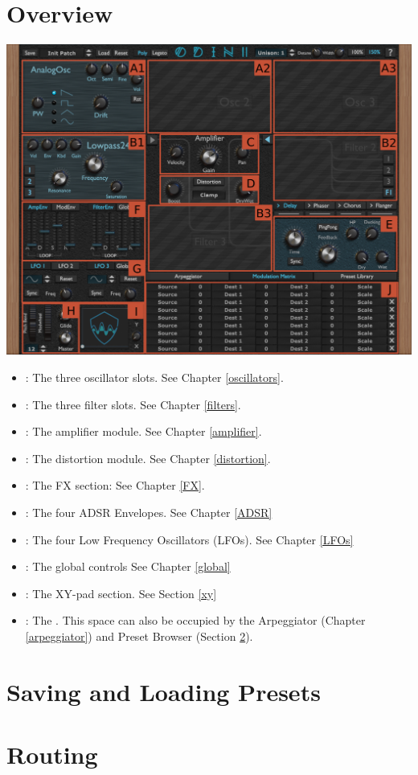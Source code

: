 \section{Overview}
\begin{center}
    \includegraphics[width=\textwidth]{graphics/overview.png}
\end{center}

\begin{itemize}
    \item {}: The three oscillator slots. See Chapter \ref{oscillators}.
    \item {}: The three filter slots. See Chapter \ref{filters}.
    \item {}: The amplifier module. See Chapter \ref{amplifier}.
    \item {}: The distortion module. See Chapter \ref{distortion}.
    \item {}: The FX section: See Chapter \ref{FX}.
    \item {}: The four ADSR Envelopes. See Chapter \ref{ADSR}
    \item {}: The four Low Frequency Oscillators (LFOs). See Chapter \ref{LFOs}
    \item {}: The global controls See Chapter \ref{global}
    \item {}: The XY-pad section. See Section \ref{xy}
    \item {}: The \modmatrix. This space can also be occupied by the Arpeggiator (Chapter \ref{arpeggiator}) and Preset Browser (Section \ref{presets}).
\end{itemize}
\section{Saving and Loading Presets}
\label{presets}
\section{Routing}
\label{routing}

